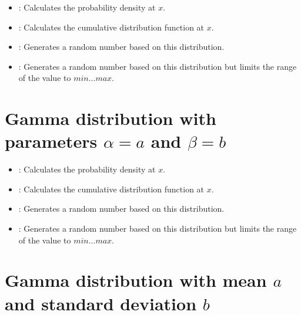 \begin{itemize}

\item
{}:
Calculates the probability density at $x$.

\item
{}:
Calculates the cumulative distribution function at $x$.

\item
{}:
Generates a random number based on this distribution.

\item
{}:
Generates a random number based on this distribution but limits the range of the value to $min\ldots max$.

\end{itemize}



\section{Gamma distribution with parameters \texorpdfstring{$\alpha=a$}{a} and \texorpdfstring{$\beta=b$}{b}}

\begin{itemize}

\item
{}:
Calculates the probability density at $x$.

\item
{}:
Calculates the cumulative distribution function at $x$.

\item
{}:
Generates a random number based on this distribution.

\item
{}:
Generates a random number based on this distribution but limits the range of the value to $min\ldots max$.

\end{itemize}



\section{Gamma distribution with mean \texorpdfstring{$a$}{a} and standard deviation \texorpdfstring{$b$}{b}}

